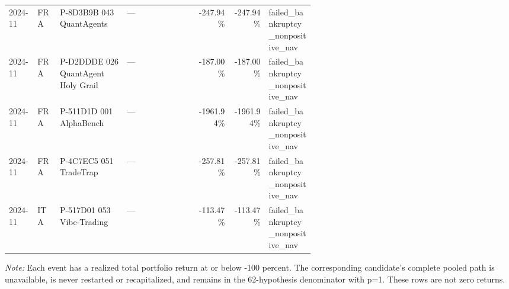 \begin{longtable}{@{}llL{0.22\linewidth}L{0.23\linewidth}rrL{0.15\linewidth}@{}}
2024-11 & FRA & P-8D3B9B 043 QuantAgents & --- & -247.94\% & -247.94\% & failed\_\allowbreak{}bankruptcy\_\allowbreak{}nonpositive\_\allowbreak{}nav \\
2024-11 & FRA & P-D2DDDE 026 QuantAgent Holy Grail & --- & -187.00\% & -187.00\% & failed\_\allowbreak{}bankruptcy\_\allowbreak{}nonpositive\_\allowbreak{}nav \\
2024-11 & FRA & P-511D1D 001 AlphaBench & --- & -1961.94\% & -1961.94\% & failed\_\allowbreak{}bankruptcy\_\allowbreak{}nonpositive\_\allowbreak{}nav \\
2024-11 & FRA & P-4C7EC5 051 TradeTrap & --- & -257.81\% & -257.81\% & failed\_\allowbreak{}bankruptcy\_\allowbreak{}nonpositive\_\allowbreak{}nav \\
2024-11 & ITA & P-517D01 053 Vibe-Trading & --- & -113.47\% & -113.47\% & failed\_\allowbreak{}bankruptcy\_\allowbreak{}nonpositive\_\allowbreak{}nav \\
\end{longtable}
\par\footnotesize\color{Ink}\emph{Note:} Each event has a realized total portfolio return at or below -100 percent. The corresponding candidate's complete pooled path is unavailable, is never restarted or recapitalized, and remains in the 62-hypothesis denominator with p=1. These rows are not zero returns.
\endgroup
